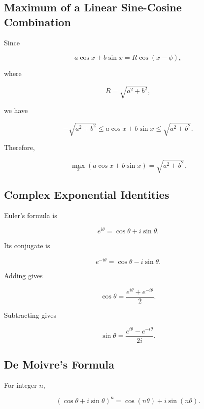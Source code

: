 \subsection{Maximum of a Linear Sine-Cosine Combination}
\label{subsec:max-linear-trig-combination}

Since

\[
a\cos x+b\sin x
=
R\cos(x-\phi),
\]

where

\[
R=\sqrt{a^2+b^2},
\]

we have

\[
\boxed{
-\sqrt{a^2+b^2}
\leq
a\cos x+b\sin x
\leq
\sqrt{a^2+b^2}.
}
\]

Therefore,

\[
\boxed{
\max_x
(a\cos x+b\sin x)
=
\sqrt{a^2+b^2}.
}
\]

\subsection{Complex Exponential Identities}
\label{subsec:complex-exponential-trig}

Euler's formula is

\[
\boxed{
e^{i\theta}
=
\cos\theta+i\sin\theta.
}
\]

Its conjugate is

\[
\boxed{
e^{-i\theta}
=
\cos\theta-i\sin\theta.
}
\]

Adding gives

\[
\boxed{
\cos\theta
=
\frac{
e^{i\theta}
+
e^{-i\theta}
}{2}.
}
\]

Subtracting gives

\[
\boxed{
\sin\theta
=
\frac{
e^{i\theta}
-
e^{-i\theta}
}{
2i
}.
}
\]

\subsection{De Moivre's Formula}
\label{subsec:de-moivre-trig-reference}

For integer \(n\),

\[
\boxed{
(\cos\theta+i\sin\theta)^n
=
\cos(n\theta)
+
i\sin(n\theta).
}
\]

